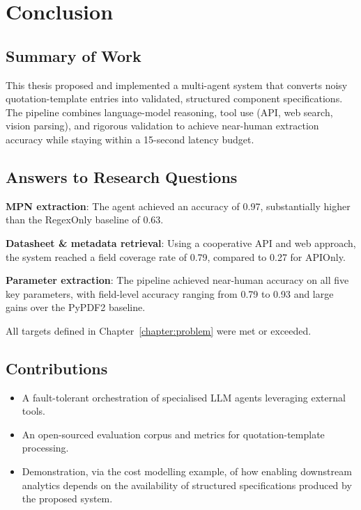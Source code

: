 \chapter{Conclusion}
\label{chapter:conclusion}

\section{Summary of Work}
This thesis proposed and implemented a multi-agent system that converts noisy quotation-template entries into validated, structured component specifications.  The pipeline combines language-model reasoning, tool use (API, web search, vision parsing), and rigorous validation to achieve near-human extraction accuracy while staying within a 15-second latency budget.

\section{Answers to Research Questions}

\textbf{MPN extraction}: The agent achieved an accuracy of 0.97, substantially higher than the RegexOnly baseline of 0.63.

\textbf{Datasheet \& metadata retrieval}: Using a cooperative API and web approach, the system reached a field coverage rate of 0.79, compared to 0.27 for APIOnly.

\textbf{Parameter extraction}: The pipeline achieved near-human accuracy on all five key parameters, with field-level accuracy ranging from 0.79 to 0.93 and large gains over the PyPDF2 baseline.

All targets defined in Chapter~\ref{chapter:problem} were met or exceeded.

\section{Contributions}
\begin{itemize}
  \item A fault-tolerant orchestration of specialised LLM agents leveraging external tools.
  \item An open-sourced evaluation corpus and metrics for quotation-template processing.
  \item Demonstration, via the cost modelling example, of how enabling downstream analytics depends on the availability of structured specifications produced by the proposed system.
\end{itemize}

